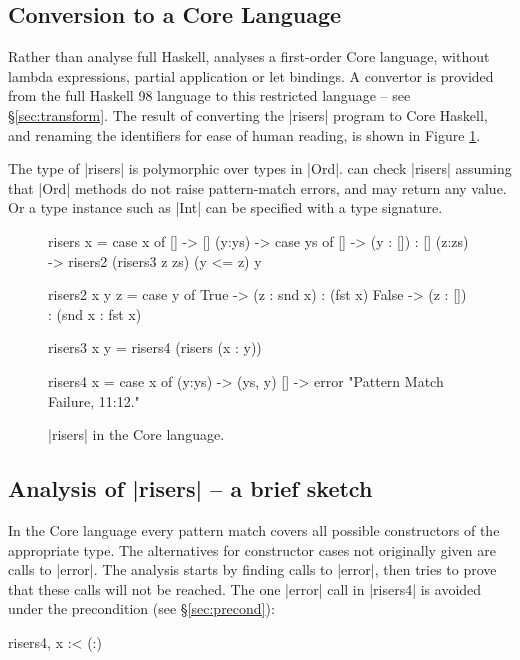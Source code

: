 \subsection{Conversion to a Core Language}

Rather than analyse full Haskell, \catch{} analyses a first-order Core language, without lambda expressions, partial application or let bindings. A convertor is provided from the full Haskell 98 language to this restricted language -- see \S\ref{sec:transform}. The result of converting the |risers| program to Core Haskell, and renaming the identifiers for ease of human reading, is shown in Figure \ref{fig:risers_core}.

The type of |risers| is polymorphic over types in |Ord|. \catch{} can check |risers| assuming that |Ord| methods do not raise pattern-match errors, and may return any value. Or a type instance such as |Int| can be specified with a type signature.

\begin{figure}
\begin{code}
risers x = case x of
    [] -> []
    (y:ys) ->  case ys of
         [] -> (y : []) : []
         (z:zs) -> risers2 (risers3 z zs) (y <= z) y

risers2 x y z =  case y of
    True -> (z : snd x) : (fst x)
    False -> (z : []) : (snd x : fst x)

risers3 x y = risers4 (risers (x : y))

risers4 x = case x of
    (y:ys) -> (ys, y)
    [] -> error "Pattern Match Failure, 11:12."
\end{code}
\caption{|risers| in the Core language.}
\label{fig:risers_core}
\figureend
\end{figure}

\subsection{Analysis of |risers| -- a brief sketch}

In the Core language every pattern match covers all possible constructors of the appropriate type. The alternatives for constructor cases not originally given are calls to |error|. The analysis starts by finding calls to |error|, then tries to prove that these calls will not be reached. The one |error| call in |risers4| is avoided under the precondition (see \S\ref{sec:precond}):

\ignore\begin{code}
risers4, x :< (:)
\end{code}

